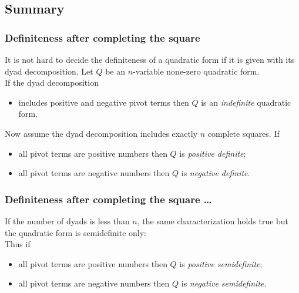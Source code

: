 \documentclass[aspectratio=169,notheorems]{corvinusmetropolis}
\theoremstyle{definition}
\begin{document}
\subsection{Summary}
\begin{frame}
    \frametitle{Definiteness after completing the square}
    It is not hard to decide the definiteness of a quadratic form if it is given with its dyad decomposition.
    Let $Q$ be an $n$-variable none-zero quadratic form.\\
    If the dyad decomposition 
    \begin{itemize}
        \item includes positive and negative pivot terms then $Q$ is an \alert{\emph{indefinite}} quadratic form.
    \end{itemize}
    Now assume the dyad decomposition includes exactly $n$ complete squares.
    If
    \begin{itemize}
        \item all pivot terms are positive numbers then $Q$ is \alert{\emph{positive definite}};
        \item all pivot terms are negative numbers then $Q$ is \alert{\emph{negative definite}}.
    \end{itemize}
\end{frame}
\begin{frame}
    \frametitle{Definiteness after completing the square \ldots}
    If the number of dyads is less than $n$, 
    the same characterization holds true but the quadratic form is semidefinite only:\\
    Thus if
    \begin{itemize}
        \item all pivot terms are positive numbers then $Q$ is \alert{\emph{positive semidefinite}};
        \item all pivot terms are negative numbers then $Q$ is \alert{\emph{negative semidefinite}}.
    \end{itemize}
\end{frame}
\end{document}
